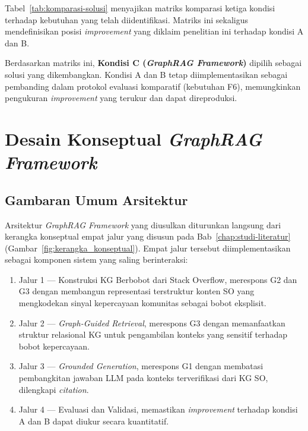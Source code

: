 Tabel~\ref{tab:komparasi-solusi} menyajikan matriks komparasi ketiga kondisi terhadap kebutuhan yang telah diidentifikasi. Matriks ini sekaligus mendefinisikan posisi \emph{improvement} yang diklaim penelitian ini terhadap kondisi A dan B.



Berdasarkan matriks ini, \textbf{Kondisi C (\emph{GraphRAG Framework})} dipilih sebagai solusi yang dikembangkan. Kondisi A dan B tetap
diimplementasikan sebagai pembanding dalam protokol evaluasi komparatif (kebutuhan F6), memungkinkan pengukuran \emph{improvement} yang terukur dan dapat direproduksi.


\section{Desain Konseptual \emph{GraphRAG Framework}}
\label{sec:desain-graphrag}

\subsection{Gambaran Umum Arsitektur}
\label{subsec:gambaran-umum-arsitektur}

Arsitektur \emph{GraphRAG Framework} yang diusulkan diturunkan langsung dari kerangka konseptual empat jalur yang disusun pada Bab~\ref{chap:studi-literatur} (Gambar~\ref{fig:kerangka_konseptual}). Empat jalur tersebut diimplementasikan sebagai komponen sistem yang saling berinteraksi:

\begin{enumerate}
    \item Jalur 1 — Konstruksi KG Berbobot dari Stack Overflow, merespons G2 dan G3 dengan membangun representasi terstruktur konten SO yang mengkodekan sinyal kepercayaan komunitas sebagai bobot eksplisit.
    \item Jalur 2 — \emph{Graph-Guided Retrieval}, merespons G3 dengan memanfaatkan struktur relasional KG untuk pengambilan
    konteks yang sensitif terhadap bobot kepercayaan.
    \item Jalur 3 — \emph{Grounded Generation}, merespons G1 dengan membatasi pembangkitan jawaban LLM pada konteks
    terverifikasi dari KG SO, dilengkapi \emph{citation}.
    \item Jalur 4 — Evaluasi dan Validasi, memastikan \emph{improvement} terhadap kondisi A dan B dapat diukur
    secara kuantitatif.
\end{enumerate}

